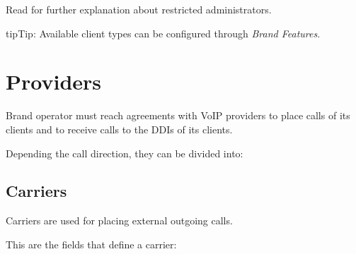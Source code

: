 \documentclass[letterpaper,10pt,english]{sphinxmanual}
\begin{document}
Read {\hyperref[api_rest/acls:acls]{}} for further explanation about restricted administrators.

\begin{notice}{tip}{Tip:}
Available client types can be configured through \emph{Brand Features}.
\end{notice}


\section{Providers}
\label{administration_portal/brand/providers/index::doc}\label{administration_portal/brand/providers/index:providers}
Brand operator must reach agreements with VoIP providers to place calls of its clients and to receive calls to the
DDIs of its clients.

Depending the call direction, they can be divided into:


\subsection{Carriers}
\label{administration_portal/brand/providers/carriers:id1}\label{administration_portal/brand/providers/carriers::doc}\label{administration_portal/brand/providers/carriers:carriers}
Carriers are used for placing external outgoing calls.

This are the fields that define a carrier:
\end{document}
